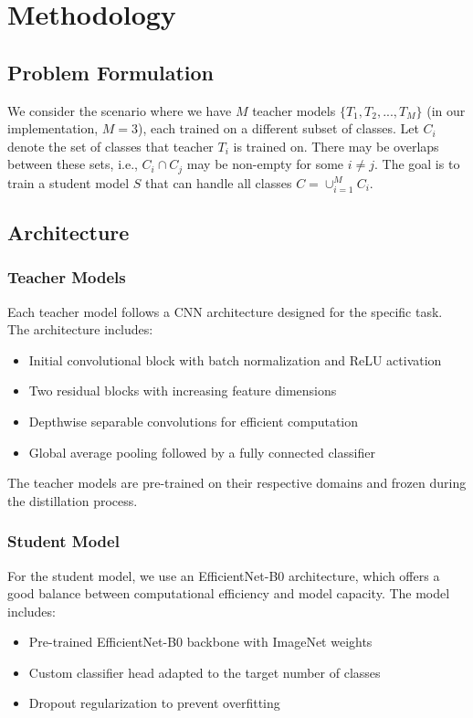 \documentclass[conference]{IEEEtran}
\begin{document}
\section{Methodology}
\subsection{Problem Formulation}
We consider the scenario where we have $M$ teacher models $\{T_1, T_2, ..., T_M\}$ (in our implementation, $M=3$), each trained on a different subset of classes. Let $C_i$ denote the set of classes that teacher $T_i$ is trained on. There may be overlaps between these sets, i.e., $C_i \cap C_j$ may be non-empty for some $i \neq j$. The goal is to train a student model $S$ that can handle all classes $C = \cup_{i=1}^{M} C_i$.

\subsection{Architecture}
\subsubsection{Teacher Models}
Each teacher model follows a CNN architecture designed for the specific task. The architecture includes:
\begin{itemize}
    \item Initial convolutional block with batch normalization and ReLU activation
    \item Two residual blocks with increasing feature dimensions
    \item Depthwise separable convolutions for efficient computation
    \item Global average pooling followed by a fully connected classifier
\end{itemize}

The teacher models are pre-trained on their respective domains and frozen during the distillation process.

\subsubsection{Student Model}
For the student model, we use an EfficientNet-B0 architecture, which offers a good balance between computational efficiency and model capacity. The model includes:
\begin{itemize}
    \item Pre-trained EfficientNet-B0 backbone with ImageNet weights
    \item Custom classifier head adapted to the target number of classes
    \item Dropout regularization to prevent overfitting
\end{itemize}
\end{document}
